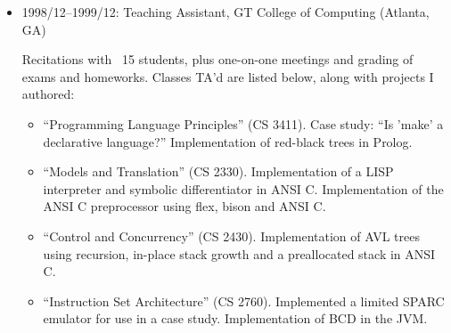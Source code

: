 \documentclass[11pt]{article}
\newenvironment{tightitemize}
{\begin{itemize}
  \setlength{\itemsep}{1pt}
  \setlength{\parskip}{0pt}
  \setlength{\parsep}{0pt}}
{\end{itemize}}
\begin{document}
\begin{tightitemize}
\begin{tightitemize}
\item Led research team, focused on intrusion prevention, parallelized and
  distributed intrusion detection, and multiple pattern matching. Implemented
  several techniques later published by academia. Led interviewing.
\item Sole developer of code for the Reflex Interceptor (now Reflex IPS(TM) and
  Reflex MG(TM)), a Layer-2 bridging NIPS running Linux. This included:
    \item tako, an IPS application statefully analyzing multiple GigE links inline
      and in real time, performing a forwarding verdict on each frame via use
      of mmap(2)ed packet sockets + custom netlink(7linux) messages,
    \item geso, an SMTP proxy making use of a Kaspersky Anti-Virus backend to
      filter mail inline and in real time, designed to be trivially extended
      to other store-and-forward protocols,
    \item build systems, automated testing and benchmarking tools, and backend
      platform configuration management for these applications, and
    \item kernel patches to change driver mechanics, expand the netlink socket
      infrastructure, and provide an interface into mmap(2)-backed sockets.
\item PCT/US2004/023739. Sys+Method for Threat Detection and Response. 2005-02-03.
\end{tightitemize}

\item 1998/12--1999/12: Teaching Assistant, GT College of Computing (Atlanta, GA)

Recitations with ~15 students, plus one-on-one meetings and grading of exams
and homeworks. Classes TA'd are listed below, along with projects I authored:

\begin{tightitemize}
\item ``Programming Language Principles'' (CS 3411). Case study: ``Is 'make' a
   declarative language?'' Implementation of red-black trees in Prolog.
\item ``Models and Translation'' (CS 2330). Implementation of a LISP interpreter
   and symbolic differentiator in ANSI C. Implementation of the ANSI C
   preprocessor using flex, bison and ANSI C.
\item ``Control and Concurrency'' (CS 2430). Implementation of AVL trees using
   recursion, in-place stack growth and a preallocated stack in ANSI C.
\item ``Instruction Set Architecture'' (CS 2760). Implemented a limited SPARC
   emulator for use in a case study. Implementation of BCD in the JVM.
\end{tightitemize}


\end{tightitemize}
\end{document}
